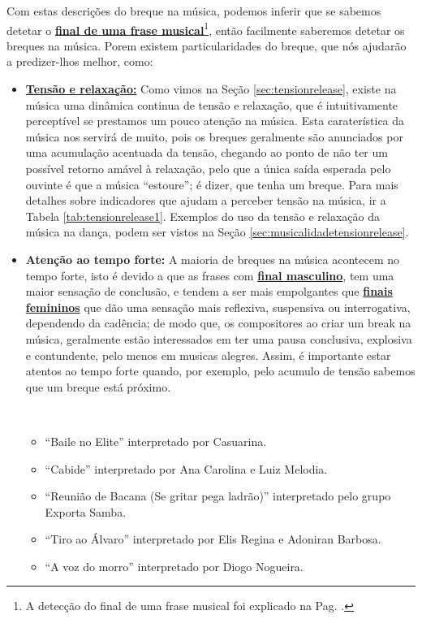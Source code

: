 Com estas descrições do breque na música, 
podemos inferir que se sabemos detetar o 
\hyperref[pos:detetandofinalfrase]{\textbf{final de uma frase musical}}\footnote{A
detecção do final de uma frase musical foi explicado na Pag. \pageref{pos:detetandofinalfrase}.},
então facilmente saberemos detetar os breques na música.
Porem existem particularidades do breque,
que nós ajudarão a predizer-lhos melhor, como:
\begin{itemize}
\item \hyperref[sec:tensionrelease]{\textbf{Tensão e relaxação:}} Como vimos na Seção \ref{sec:tensionrelease},
existe na música uma dinâmica continua de tensão e relaxação,
que é intuitivamente perceptível se prestamos um pouco atenção  na música.
Esta caraterística da música nos servirá de muito, 
pois os breques geralmente são anunciados por uma acumulação acentuada da tensão,
chegando ao ponto de não ter um possível retorno amável à relaxação, 
pelo que a única saída esperada pelo ouvinte é que a música ``estoure'';
é dizer, que tenha um breque.
Para mais detalhes sobre indicadores que ajudam a perceber tensão na música, ir a Tabela \ref{tab:tensionrelease1}.
Exemplos do uso da tensão e relaxação da música na dança, podem ser vistos na Seção \ref{sec:musicalidadetensionrelease}.
\item \textbf{Atenção ao tempo forte:} A maioria de breques na música acontecem no tempo forte,
isto é devido a que as frases com \hyperref[subsubsec:finalmasculino]{\textbf{final masculino}},
tem uma maior sensação de conclusão, e tendem a ser mais empolgantes que 
\hyperref[subsubsec:finalfemenino]{\textbf{finais femininos}} que dão uma sensação mais reflexiva, 
suspensiva ou interrogativa, dependendo da cadência; de modo que, 
os compositores ao criar um break na música,
geralmente estão interessados em ter uma pausa conclusiva, explosiva e contundente,
pelo menos em musicas alegres.
Assim, é importante estar atentos ao tempo forte quando, por exemplo, 
pelo acumulo de tensão sabemos que um breque está próximo.
\begin{example}~
\label{ex:breakmasculinos}
\begin{itemize}
\item ``Baile no Elite'' interpretado por Casuarina.
\item ``Cabide'' interpretado por Ana Carolina e Luiz Melodia.
\item ``Reunião de Bacana (Se gritar pega ladrão)'' interpretado pelo grupo Exporta Samba.
\item ``Tiro ao Álvaro'' interpretado por Elis Regina e Adoniran Barbosa. 
\item ``A voz do morro'' interpretado por Diogo Nogueira.
\end{itemize}
\end{example}


\end{itemize}
